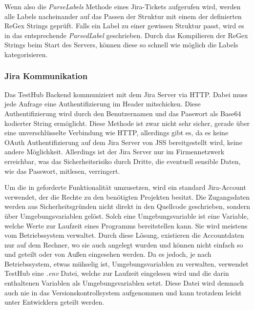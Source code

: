 Wenn also die \textit{ParseLabels} Methode eines Jira-Tickets aufgerufen wird, werden
alle Labels nacheinander auf das Passen der Struktur mit einem der definierten ReGex Strings geprüft.
Falls ein Label zu einer gewissen Struktur passt, wird es in das entsprechende \textit{ParsedLabel}
geschrieben. Durch das Kompilieren der ReGex Strings beim Start des Servers, können 
diese so schnell wie möglich die Labels kategorisieren.

\subsubsection{\gls{Jira} Kommunikation}
Das TestHub Backend kommuniziert mit dem \gls{Jira} Server via \gls{HTTP}. Dabei muss 
jede Anfrage eine Authentifizierung im Header mitschicken. Diese Authentifizierung
wird durch den Benutzernamen und das Passwort als Base64 kodierter String ermöglicht.
Diese Methode ist zwar nicht sehr sicher, gerade über eine unverschlüsselte
Verbindung wie \gls{HTTP}, allerdings gibt es, da es keine OAuth Authentifizierung auf
dem \gls{Jira} Server von \gls{JSS} bereitgestellt wird, keine andere Möglichkeit.
Allerdings ist der \gls{Jira} Server nur im Firmennetzwerk erreichbar, was das Sicherheitsrisiko
durch Dritte, die eventuell sensible Daten, wie das Passwort, mitlesen, verringert.

Um die in  geforderte Funktionalität umzusetzen, 
wird ein standard Jira-Account verwendet, der die Rechte zu den benötigten Projekten besitzt.
Die Zugangsdaten werden aus Sicherheitsgründen nicht direkt in den Quellcode geschrieben, 
sondern über Umgebungsvariablen gelöst. Solch eine Umgebungsvariable ist eine Variable, 
welche Werte zur Laufzeit eines Programms bereitstellen kann. Sie wird meistens vom Betriebssystem verwaltet.
Durch diese Lösung, existieren die Accountdaten nur auf dem Rechner, wo sie auch
angelegt wurden und können nicht einfach so und geteilt oder von Außen eingesehen werden.
Da es jedoch, je nach Betriebssystem, etwas mühselig ist, Umgebungsvariablen zu
verwalten, verwendet TestHub eine \textit{.env} Datei, welche zur Laufzeit eingelesen
wird und die darin enthaltenen Variablen als Umgebungsvariablen setzt. Diese Datei
wird demnach auch nie in das Versionskontrollsystem aufgenommen und kann trotzdem
leicht unter Entwicklern geteilt werden.

